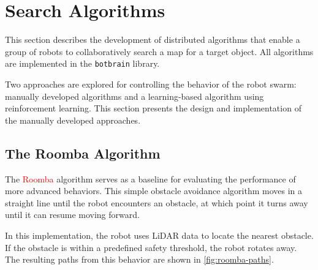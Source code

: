 \section{Search Algorithms}
This section describes the development of distributed algorithms that enable a group of robots to collaboratively search a map for a target object. All algorithms are implemented in the \texttt{botbrain} library.

Two approaches are explored for controlling the behavior of the robot swarm: manually developed algorithms and a learning-based algorithm using reinforcement learning. This section presents the design and implementation of the manually developed approaches.

\subsection{The {\color{red}Roomba} Algorithm}
The \textcolor{red}{Roomba} algorithm serves as a baseline for evaluating the performance of more advanced behaviors. This simple obstacle avoidance algorithm moves in a straight line until the robot encounters an obstacle, at which point it turns away until it can resume moving forward.

In this implementation, the robot uses LiDAR data to locate the nearest obstacle. If the obstacle is within a predefined safety threshold, the robot rotates away. The resulting paths from this behavior are shown in \cref{fig:roomba-paths}.

